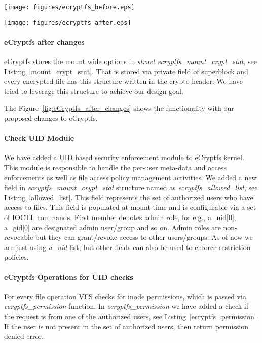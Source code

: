 \begin{figure*}[t]
\centering
\begin{minipage}[b]{0.45\textwidth}
	\texttt{[image: figures/ecryptfs\_before.eps]}
    \caption{eCryptfs before changes}
    \label{fig:eCryptfs_before_changes}
\end{minipage}
\hspace{0.05\textwidth}
\begin{minipage}[b]{0.45\textwidth}
	\texttt{[image: figures/ecryptfs\_after.eps]}
    \caption{eCryptfs after changes}
    \label{fig:eCryptfs_after_changes}
\end{minipage}
\end{figure*}

\paragraph{eCryptfs after changes} eCryptfs stores the mount wide
options in \emph{struct ecryptfs\_mount\_crypt\_stat}, see
Listing~\ref{mount_crypt_stat}.  That is stored via private field of
superblock and every encrypted file has this structure written in the
crypto header.  We have tried to leverage this structure to achieve
our design goal.

The Figure~\ref{fig:eCryptfs_after_changes} shows the functionality
with our proposed changes to eCryptfs.

\paragraph{Check UID Module}
We have added a UID based security enforcement module to eCryptfs
kernel.  This module is responsible to handle the per-user meta-data
and access enforcements as well as file access policy management
activities.  We added a new field in
\emph{ecryptfs\_mount\_crypt\_stat} structure named as
\emph{ecryptfs\_allowed\_list}, see Listing~\ref{allowed_list}.  This
field represents the set of authorized users who have access to files.
This field is populated at mount time and is configurable via a set of
IOCTL commands.  First member denotes admin role, for e.g., a\_uid[0],
a\_gid[0] are designated admin user/group and so on.  Admin roles are
non-revocable but they can grant/revoke access to other users/groups.
As of now we are just using \emph{a\_uid} list, but other fields can
also be used to enforce restriction policies.

\paragraph{eCryptfs Operations for UID checks}
For every file operation VFS checks for inode permissions, which is
passed via \emph{ecryptfs\_permission} function.  In
\emph{ecryptfs\_permission} we have added a check if the request is
from one of the authorized users, see
Listing~\ref{ecryptfs_permission}.  If the user is not present in the
set of authorized users, then return permission denied error.

